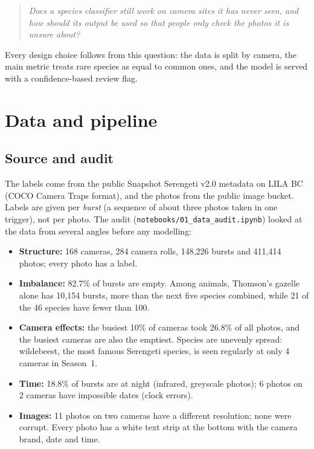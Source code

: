 \documentclass[11pt,a4paper]{article}
\begin{document}
\begin{quote}
\emph{Does a species classifier still work on camera sites it has never seen, and how should its output
be used so that people only check the photos it is unsure about?}
\end{quote}

Every design choice follows from this question: the data is split by camera, the main metric treats
rare species as equal to common ones, and the model is served with a confidence-based review flag.

\section{Data and pipeline}

\subsection{Source and audit}
The labels come from the public Snapshot Serengeti v2.0 metadata on LILA BC (COCO Camera Traps
format), and the photos from the public image bucket. Labels are given per \emph{burst} (a sequence of
about three photos taken in one trigger), not per photo. The audit (\texttt{notebooks/01\_data\_audit.ipynb})
looked at the data from several angles before any modelling:

\begin{itemize}
\item \textbf{Structure:} 168 cameras, 284 camera rolls, 148,226 bursts and 411,414 photos; every photo has a label.
\item \textbf{Imbalance:} 82.7\% of bursts are empty. Among animals, Thomson's gazelle alone has 10,154
      bursts, more than the next five species combined, while 21 of the 46 species have fewer than 100.
\item \textbf{Camera effects:} the busiest 10\% of cameras took 26.8\% of all photos, and the busiest
      cameras are also the emptiest. Species are unevenly spread: wildebeest, the most famous Serengeti
      species, is seen regularly at only 4 cameras in Season~1.
\item \textbf{Time:} 18.8\% of bursts are at night (infrared, greyscale photos); 6 photos on 2 cameras
      have impossible dates (clock errors).
\item \textbf{Images:} 11 photos on two cameras have a different resolution; none were corrupt. Every photo has a
      white text strip at the bottom with the camera brand, date and time.
\end{itemize}
\end{document}
